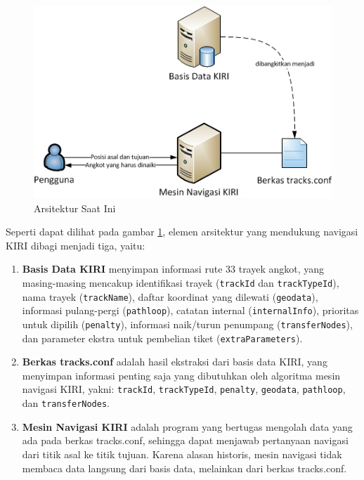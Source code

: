 \begin{figure}
	\centering
	\includegraphics[scale=1]{Gambar/2_arsitektur_saat_ini}
	\caption{Arsitektur Saat Ini} 
	\label{fig:2_arsitektur_saat_ini}
\end{figure}

Seperti dapat dilihat pada gambar \ref{fig:2_arsitektur_saat_ini}, elemen
arsitektur yang mendukung navigasi KIRI dibagi menjadi tiga, yaitu:

\begin{enumerate}
	\item \textbf{Basis Data KIRI} menyimpan informasi rute 33 trayek angkot, yang masing-masing mencakup identifikasi trayek (\texttt{trackId} dan \texttt{trackTypeId}), nama trayek (\texttt{trackName}), daftar koordinat yang dilewati (\texttt{geodata}), informasi pulang-pergi (\texttt{pathloop}), catatan internal (\texttt{internalInfo}), prioritas untuk dipilih (\texttt{penalty}), informasi naik/turun penumpang (\texttt{transferNodes}), dan parameter ekstra untuk pembelian tiket (\texttt{extraParameters}).
	\item \textbf{Berkas tracks.conf} adalah hasil ekstraksi dari basis data KIRI, yang menyimpan informasi penting saja yang dibutuhkan oleh algoritma mesin navigasi KIRI, yakni: \texttt{trackId}, \texttt{trackTypeId}, \texttt{penalty}, \texttt{geodata}, \texttt{pathloop}, dan \texttt{transferNodes}.
	\item \textbf{Mesin Navigasi KIRI} adalah program yang bertugas mengolah data yang ada pada berkas tracks.conf, sehingga dapat menjawab pertanyaan navigasi dari titik asal ke titik tujuan. Karena alasan historis, mesin navigasi tidak membaca data langsung dari basis data, melainkan dari berkas tracks.conf.
\end{enumerate}

